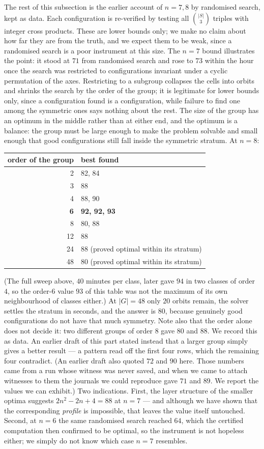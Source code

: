 \documentclass[11pt,a4paper]{article}
\begin{document}
The rest of this subsection is the earlier account of $n=7,8$ by randomised search, kept as data.  Each configuration is re-verified by testing all $\binom{|S|}{3}$ triples with integer cross products.  These
are lower bounds only; we make no claim about how far they are from the truth, and we expect them to be weak,
since a randomised search is a poor instrument at this size.  The $n=7$ bound illustrates the point: it stood
at $71$ from randomised search and rose to $73$ within the hour once the search was restricted to
configurations invariant under a cyclic permutation of the axes.  Restricting to a subgroup collapses the cells
into orbits and shrinks the search by the order of the group; it is legitimate for lower bounds only, since a
configuration found is a configuration, while failure to find one among the symmetric ones says nothing about
the rest.  The size of the group has an optimum in the middle rather than at either end, and the optimum is a balance:
the group must be large enough to make the problem solvable and small enough that good configurations still
fall inside the symmetric stratum.  At $n=8$:
\begin{center}
\begin{tabular}{rl}\toprule
order of the group & best found\\\midrule
2 & 82, 84\\ 3 & 88\\ 4 & 88, 90\\ \textbf{6} & \textbf{92, 92, 93}\\ 8 & 80, 88\\ 12 & 88\\
24 & 88 (proved optimal within its stratum)\\ 48 & 80 (proved optimal within its stratum)\\\bottomrule
\end{tabular}
\end{center}
(The full sweep above, $40$ minutes per class, later gave $94$ in two classes of order $4$, so the
order-$6$ value $93$ of this table was not the maximum of its own neighbourhood of classes either.)
At $|G|=48$ only $20$ orbits remain, the solver settles the stratum in seconds, and the answer is $80$, because
genuinely good configurations do not have that much symmetry.  Note also that the order alone does not decide
it: two different groups of order $8$ gave $80$ and $88$.  We record this as data.  An earlier draft of this
part stated instead that a larger group simply gives a better result --- a pattern read off the first four
rows, which the remaining four contradict.  (An earlier draft also quoted
$72$ and $90$ here.  Those numbers came from a run whose witness was never saved, and when we came to attach
witnesses to them the journals we could reproduce gave $71$ and $89$.  We report the values we can exhibit.)
Two indications.  First, the layer structure of
the smaller optima suggests $2n^2-2n+4=88$ at $n=7$ --- and although we have shown that the corresponding
\emph{profile} is impossible, that leaves the value itself untouched.  Second, at $n=6$ the same randomised
search reached $64$, which the certified computation then confirmed to be optimal, so the instrument is not
hopeless either; we simply do not know which case $n=7$ resembles.
\end{document}
